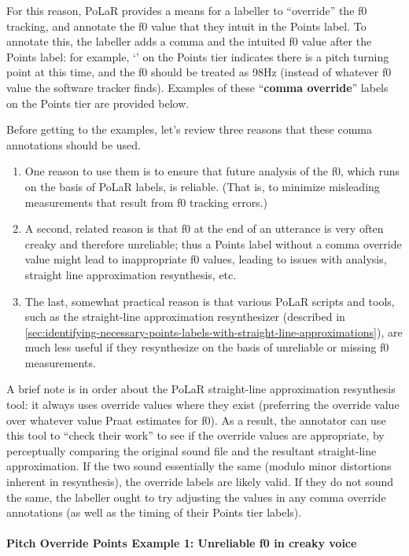 \documentclass[11pt, twoside]{memoir}
\def\textlabel#1{{\relsize{-.5}\fontspec[Mapping=tex-text]{Roboto Mono}{#1}}}
\begin{document}
For this reason, PoLaR provides a means for a labeller to “override” the f0 tracking, and annotate the f0 value that they intuit in the Points label. To annotate this, the labeller adds a comma and the intuited f0 value after the Points label: for example, ‘\textlabel{0,98}’ on the Points tier indicates there is a pitch turning point at this time, and the f0 should be treated as 98Hz (instead of whatever f0 value the software tracker finds). Examples of these “\textbf{comma override}” labels on the Points tier are provided below.

Before getting to the examples, let’s review three reasons that these comma annotations should be used.
\begin{enumerate}
	\item One reason to use them is to ensure that future analysis of the f0, which runs on the basis of PoLaR labels, is reliable. (That is, to minimize misleading measurements that result from f0 tracking errors.)
	\item A second, related reason is that f0 at the end of an utterance is very often creaky and therefore unreliable; thus a Points label without a comma override value might lead to inappropriate f0 values, leading to issues with analysis, straight line approximation resynthesis, etc.
	\item The last, somewhat practical  reason is that various PoLaR scripts and tools, such as the straight-line approximation resynthesizer (described in \ref{sec:identifying-necessary-points-labels-with-straight-line-approximations}), are much less useful if they resynthesize on the basis of unreliable or missing f0 measurements.
\end{enumerate}

A brief note is in order about the PoLaR straight-line approximation resynthesis tool: it always uses override values where they exist (preferring the override value over whatever value Praat estimates for f0). As a result, the annotator can use this tool to “check their work” to see if the override values are appropriate, by perceptually comparing the original sound file and the resultant straight-line approximation. If the two sound essentially the same (modulo minor distortions inherent in resynthesis), the override labels are likely valid. If they do not sound the same, the labeller ought to try adjusting the values in any comma override annotations (as well as the timing of their Points tier labels).

\paragraph{Pitch Override Points Example 1: Unreliable f0 in creaky voice\label{pitch-override-points-example-1}}
\end{document}
